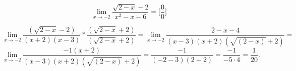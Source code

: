 {}

$$ \lim_{x\to{-2}} \dfrac{\sqrt{2-x}-2}{x^2-x-6} = \Big[\dfrac{0}{0}\Big] $$

$$
  \lim_{x\to{-2}} \dfrac{(\sqrt{2-x}-2)}{(x+2)(x-3)} * \dfrac{(\sqrt{2-x}+2)}{(\sqrt{2-x}+2)} =
  \lim_{x\to{-2}} \dfrac{2-x-4}{(x-3)(x+2)(\sqrt{(2-x)}+2)} =
$$
$$
  \lim_{x\to{-2}} \dfrac{-1(x+2)}{(x-3)(x+2)(\sqrt{(2-x)}+2)} =
  \dfrac{-1}{(-2-3)(2+2)} =
  \dfrac{-1}{-5\cdot4} =
  \dfrac{1}{20}.
$$
